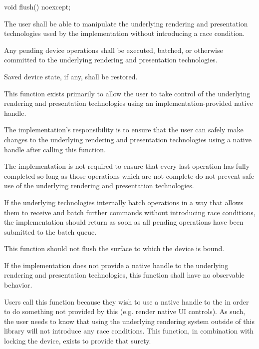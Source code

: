 \begin{itemdecl}
void flush() noexcept;
\end{itemdecl}
\begin{itemdescr}
	\pnum
	\effects
	The user shall be able to manipulate the underlying rendering and 
	presentation technologies used by the implementation without introducing a 
	race condition.
	
	\pnum
	\postconditions
	Any pending device operations shall be executed, batched, or otherwise committed to the underlying rendering and presentation technologies.
	
	\pnum 
	Saved device state, if any, shall be restored.

	\pnum
	\remarks
	This function exists primarily to allow the user to take control of the 
	underlying rendering and presentation technologies using an 
	implementation-provided native handle.
	
	\pnum
	The implementation's responsibility is to ensure that the user can safely make changes to the underlying rendering and presentation technologies using a native handle after calling this function.
	
	\pnum
	The implementation is not required to ensure that every last operation has fully completed so long as those operations which are not complete do not prevent safe use of the underlying rendering and presentation technologies.

	\pnum
	If the underlying technologies internally batch operations in a way that allows them to receive and batch further commands without introducing race conditions, the implementation should return as soon as all pending operations have been submitted to the batch queue.
	
	\pnum
	This function should not flush the surface to which the device is bound.
	
	\pnum
	If the implementation does not provide a native handle to the underlying rendering and presentation technologies, this function shall have no observable behavior.
	
	\pnum
	\realnotes
	Users call this function because they wish to use a native handle to the \underlyingrendandpresenttechs in order to do something not provided by this \documenttypename{} (e.g. render native UI controls). As such, the user needs to know that using the underlying rendering system outside of this library will not introduce any race conditions. This function, in combination with locking the device, exists to provide that surety.
\end{itemdescr}

